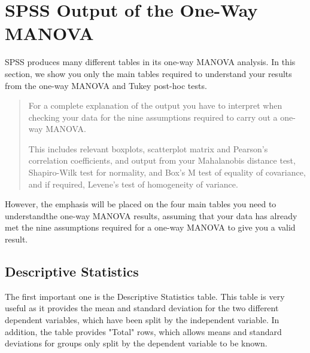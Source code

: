 \documentclass[a4paper,12pt]{article}
\begin{document}
%
%
%
%
%
%
%
%
%
\newpage
\section{SPSS Output of the One-Way MANOVA}
SPSS produces many different tables in its one-way MANOVA analysis. In this section, we show you only the main tables required to understand your results from the one-way MANOVA and Tukey post-hoc tests.

\begin{quote}
For a complete explanation of the output you have to interpret when checking your data for the nine assumptions required to carry out a one-way MANOVA.

This includes relevant boxplots, scatterplot matrix and Pearson's correlation coefficients, and output from your Mahalanobis distance test, Shapiro-Wilk test for normality, and Box's M test of equality of covariance, and if required, Levene's test of homogeneity of variance.
\end{quote}
However, the emphasis will be placed on the four main tables you need to understandthe one-way MANOVA results, assuming that your data has already met the nine assumptions required for a one-way MANOVA to give you a valid result.



\subsection{Descriptive Statistics}
The first important one is the Descriptive Statistics table. This table is very useful as it provides the mean and standard deviation for the two different dependent variables, which have been split by the independent variable. In addition, the table provides "Total" rows, which allows means and standard deviations for groups only split by the dependent variable to be known.
\end{document}
